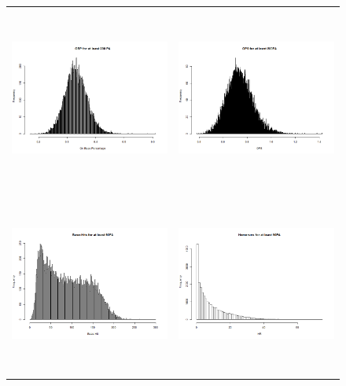 \documentclass[dvipdfmx]{article}
\begin{document}
\begin{itemize}
  \begin{figure}[H]
   \centering
   \begin{tabular}{cc}
    \includegraphics[width = 8cm, height = 6cm]{graphs/OBP_200PA.png} &
    \includegraphics[width = 8cm, height = 6cm]{graphs/OPS_200PA.png} \\
    \includegraphics[width = 8cm, height = 6cm]{graphs/H_90PA.png} &
    \includegraphics[width = 8cm, height = 6cm]{graphs/HR_90PA.png} \\

\end{tabular}
\end{figure}
\end{itemize}
\end{document}

